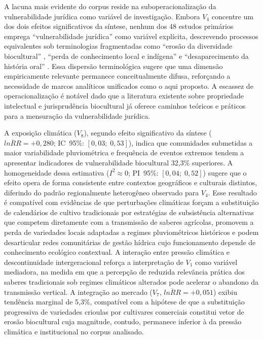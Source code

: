 \documentclass[12pt,a4paper]{article}
\begin{document}
A lacuna mais evidente do corpus reside na suboperacionalização da vulnerabilidade jurídica como variável de investigação. Embora $V_4$ concentre um dos dois efeitos significativos da síntese, nenhum dos 48 estudos primários emprega ``vulnerabilidade jurídica'' como variável explícita, descrevendo processos equivalentes sob terminologias fragmentadas como ``erosão da diversidade biocultural'' \citep{Mobarak2025}, ``perda de conhecimento local e indígena'' \citep{Suwardi2025} e ``desaparecimento da história oral'' \citep{LaRosa2021}. Essa dispersão terminológica sugere que uma dimensão empiricamente relevante permanece conceitualmente difusa, reforçando a necessidade de marcos analíticos unificados como o aqui proposto. A escassez de operacionalização é notável dado que a literatura existente sobre propriedade intelectual \citep{Dutfield2004} e jurisprudência biocultural \citep{BavikatteRobinson2011,Nemoga2022} já oferece caminhos teóricos e práticos para a mensuração da vulnerabilidade jurídica.

A exposição climática ($V_8$), segundo efeito significativo da síntese ($\overline{lnRR} = +0{,}280$; IC~95\%: $[0{,}03;\; 0{,}53]$), indica que comunidades submetidas a maior variabilidade pluviométrica e frequência de eventos extremos tendem a apresentar indicadores de vulnerabilidade biocultural 32,3\% superiores. A homogeneidade dessa estimativa ($I^2 \approx 0$; PI~95\%: $[0{,}04;\; 0{,}52]$) sugere que o efeito opera de forma consistente entre contextos geográficos e culturais distintos, diferindo do padrão regionalmente heterogêneo observado para $V_4$. Esse resultado é compatível com evidências de que perturbações climáticas forçam a substituição de calendários de cultivo tradicionais por estratégias de subsistência alternativas que competem diretamente com a transmissão de saberes agrícolas, promovem a perda de variedades locais adaptadas a regimes pluviométricos históricos \citep{Savo2016} e podem desarticular redes comunitárias de gestão hídrica cujo funcionamento depende de conhecimento ecológico contextual. A interação entre pressão climática e descontinuidade intergeracional reforça a interpretação de $V_1$ como variável mediadora, na medida em que a percepção de reduzida relevância prática dos saberes tradicionais sob regimes climáticos alterados pode acelerar o abandono da transmissão vertical. A integração ao mercado ($V_7$, $\overline{lnRR} = +0{,}051$) exibiu tendência marginal de 5,3\%, compatível com a hipótese de que a substituição progressiva de variedades crioulas por cultivares comerciais constitui vetor de erosão biocultural cuja magnitude, contudo, permanece inferior à da pressão climática e institucional no corpus analisado.
\end{document}
